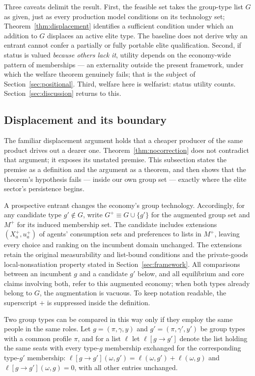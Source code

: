 \documentclass[12pt,letterpaper]{article}
\theoremstyle{definition}
\begin{document}
Three caveats delimit the result.
First, the feasible set takes the group-type list $G$ as given, just as every production model conditions on its technology set; Theorem~\ref{thm:displacement} identifies a sufficient condition under which an addition to $G$ displaces an active elite type.
The baseline does not derive why an entrant cannot confer a partially or fully portable elite qualification.
Second, if status is valued \emph{because others lack it}, utility depends on the economy-wide pattern of memberships --- an externality outside the present framework, under which the welfare theorem genuinely fails; that is the subject of Section~\ref{sec:positional}.
Third, welfare here is welfarist: status utility counts.
Section~\ref{sec:discussion} returns to this.

\subsection{Displacement and its boundary}\label{sec:displacement}

The familiar displacement argument holds that a cheaper producer of the same product drives out a dearer one.
Theorem~\ref{thm:nocorrection} does not contradict that argument; it exposes its unstated premise.
This subsection states the premise as a definition and the argument as a theorem, and then shows that the theorem's hypothesis fails --- inside our own group set --- exactly where the elite sector's persistence begins.

A prospective entrant changes the economy's group technology.
Accordingly, for any candidate type $g'\notin G$, write $G^+\equiv G\cup\{g'\}$ for the augmented group set and $M^+$ for its induced membership set.
The candidate includes extensions $(X_a^+,u_a^+)$ of agents' consumption sets and preferences to lists in $M^+$, leaving every choice and ranking on the incumbent domain unchanged.
The extensions retain the original measurability and list-bound conditions and the private-goods local-nonsatiation property stated in Section~\ref{sec:framework}.
All comparisons between an incumbent $g$ and a candidate $g'$ below, and all equilibrium and core claims involving both, refer to this augmented economy; when both types already belong to $G$, the augmentation is vacuous.
To keep notation readable, the superscript $+$ is suppressed inside the definition.

Two group types can be compared in this way only if they employ the same people in the same roles.
Let $g=(\pi,\gamma,y)$ and $g'=(\pi,\gamma',y')$ be group types with a common profile $\pi$, and for a list $\ell$ let $\ell[g\rightarrow g']$ denote the list holding the same seats with every type-$g$ membership exchanged for the corresponding type-$g'$ membership: $\ell[g\rightarrow g'](\omega,g')=\ell(\omega,g')+\ell(\omega,g)$ and $\ell[g\rightarrow g'](\omega,g)=0$, with all other entries unchanged.
\end{document}

